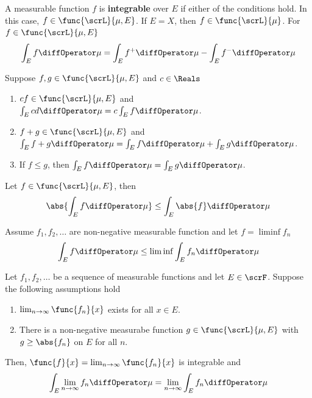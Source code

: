 \begin{definition}
    A measurable function \(f\) is \textbf{integrable} over \(E\) if either of the conditions hold. In this case, \(f \in \func{\scrL}{\mu,E}\). If \(E = X\), then \(f \in \func{\scrL}{\mu}\). For \(f \in \func{\scrL}{\mu,E}\) 
    \begin{equation*}
        \int_E f \diffOperator \mu  = \int_E f^+ \diffOperator \mu - \int_E f^- \diffOperator \mu 
    \end{equation*}
\end{definition}

\begin{theorem}
    Suppose \(f,g \in \func{\scrL}{\mu,E}\) and \(c \in \Reals\) 
    \begin{enumerate}
        \item \(cf \in \func{\scrL}{\mu,E}\) and \(\int_E cd \diffOperator \mu = c \int_E f \diffOperator \mu\). 
        \item \(f +g \in \func{\scrL}{\mu,E}\) and \(\int_E f + g \diffOperator \mu = \int_E f \diffOperator \mu + \int_E g \diffOperator \mu\).
        \item If \(f \leq g\), then \(\int_E f\diffOperator \mu = \int_E g \diffOperator \mu\).
    \end{enumerate}
\end{theorem}

\begin{corollary}
    Let \(f \in \func{\scrL}{\mu,E}\), then 
    \begin{equation*}
        \abs{\int_E f \diffOperator \mu} \leq \int_E \abs{f} \diffOperator \mu 
    \end{equation*}
\end{corollary}

\begin{lemma}
    Assume \(f_1, f_2, \dots\) are non-negative measurable function and let \(f = \liminf f_n\)
    \begin{equation*}
        \int_E f \diffOperator \mu \leq \liminf \int_E f_n \diffOperator \mu 
    \end{equation*}
\end{lemma}

\begin{theorem}
    Let \(f_1, f_2, \dots \) be a sequence of measurable functions and let \(E \in \scrF\). Suppose the following assumptions hold 
    \begin{enumerate}
        \item \(\lim_{n \to \infty} \func{f_n}{x}\) exists for all \(x \in E\).
        \item There is a non-negative measurabe function \(g \in \func{\scrL}{\mu,E}\) with \(g \geq \abs{f_n}\) on \(E\) for all \(n\).
    \end{enumerate}
    Then, \(\func{f}{x} = \lim_{n \to \infty} \func{f_n}{x}\) is integrable and 
    \begin{equation*}
        \int_E \lim_{n \to \infty} f_n \diffOperator \mu = \lim_{n \to \infty} \int_E f_n \diffOperator \mu
    \end{equation*}
\end{theorem}

